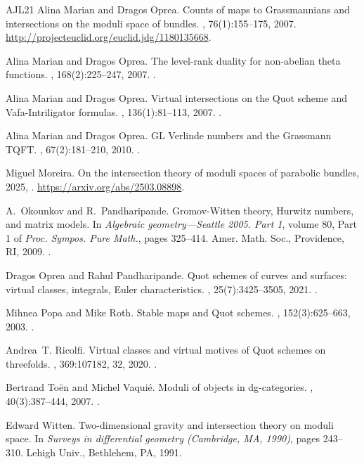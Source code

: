 \documentclass[11pt]{amsart}
\theoremstyle{remark}
\numberwithin{theorem}{section}
\begin{document}
\begin{thebibliography}{AJL{\etalchar{+}}21}
Alina Marian and Dragos Oprea.
\newblock Counts of maps to {G}rassmannians and intersections on the moduli
  space of bundles.
, 76(1):155--175, 2007.
\newblock \urlprefix\url{http://projecteuclid.org/euclid.jdg/1180135668}.

Alina Marian and Dragos Oprea.
\newblock The level-rank duality for non-abelian theta functions.
, 168(2):225--247, 2007.
\newblock {}.

Alina Marian and Dragos Oprea.
\newblock Virtual intersections on the {Q}uot scheme and {V}afa-{I}ntriligator
  formulas.
, 136(1):81--113, 2007.
\newblock {}.

Alina Marian and Dragos Oprea.
\newblock G{L} {V}erlinde numbers and the {G}rassmann {TQFT}.
, 67(2):181--210, 2010.
\newblock {}.

Miguel Moreira.
\newblock On the intersection theory of moduli spaces of parabolic bundles,
  2025, .
\newblock \urlprefix\url{https://arxiv.org/abs/2503.08898}.

A.~Okounkov and R.~Pandharipande.
\newblock Gromov-{W}itten theory, {H}urwitz numbers, and matrix models.
\newblock In {\em Algebraic geometry---{S}eattle 2005. {P}art 1}, volume 80,
  Part 1 of {\em Proc. Sympos. Pure Math.}, pages 325--414. Amer. Math. Soc.,
  Providence, RI, 2009.
\newblock {}.

Dragos Oprea and Rahul Pandharipande.
\newblock Quot schemes of curves and surfaces: virtual classes, integrals,
  {E}uler characteristics.
, 25(7):3425--3505, 2021.
\newblock {}.

Mihnea Popa and Mike Roth.
\newblock Stable maps and {Q}uot schemes.
, 152(3):625--663, 2003.
\newblock {}.

Andrea~T. Ricolfi.
\newblock Virtual classes and virtual motives of {Q}uot schemes on threefolds.
, 369:107182, 32, 2020.
\newblock {}.

Bertrand To\"en and Michel Vaqui\'e.
\newblock Moduli of objects in dg-categories.
, 40(3):387--444, 2007.
\newblock {}.

Edward Witten.
\newblock Two-dimensional gravity and intersection theory on moduli space.
\newblock In {\em Surveys in differential geometry ({C}ambridge, {MA}, 1990)},
  pages 243--310. Lehigh Univ., Bethlehem, PA, 1991.

\end{thebibliography}

	
\end{document}
